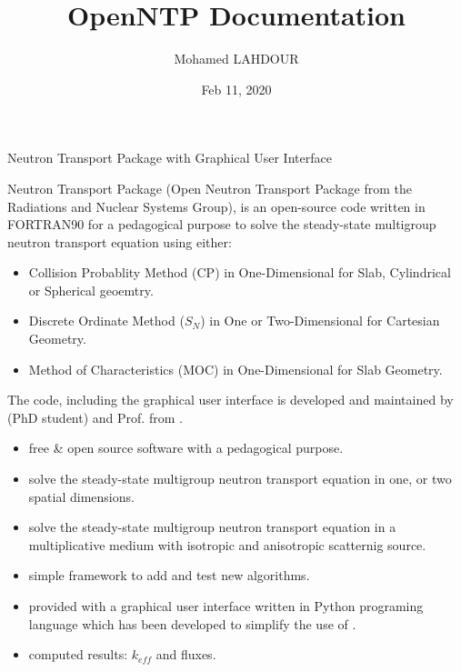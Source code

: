 \documentclass[letterpaper,10pt,english]{sphinxmanual}
\title{OpenNTP Documentation}
\date{Feb 11, 2020}
\author{Mohamed LAHDOUR}
\begin{document}
\pagestyle{empty}
\sphinxmaketitle
\pagestyle{plain}
\sphinxtableofcontents
\pagestyle{normal}
\label{\detokenize{index::doc}}


Neutron Transport Package with Graphical User Interface

Neutron Transport Package  (Open Neutron Transport Package from the Radiations and Nuclear Systems Group), is an open-source code written in FORTRAN90 for a pedagogical purpose to solve the steady-state multigroup neutron transport equation using either:
\begin{itemize}
\item {} 
Collision Probablity Method (CP) in One-Dimensional for Slab, Cylindrical or Spherical geoemtry.

\item {} 
Discrete Ordinate Method (\(S_{N}\)) in One or Two-Dimensional for Cartesian Geometry.

\item {} 
Method of Characteristics (MOC) in One-Dimensional for Slab Geometry.

\end{itemize}

The code, including the graphical user interface is developed and maintained by  (PhD student) and Prof.  from  .

\begin{itemize}
\item {} 
free \& open source software with a pedagogical purpose.

\item {} 
solve the steady-state multigroup neutron transport equation in one, or two spatial dimensions.

\item {} 
solve the steady-state multigroup neutron transport equation  in a multiplicative medium with isotropic and anisotropic scatternig source.

\item {} 
simple framework to add and test new algorithms.

\item {} 
provided with a graphical user interface written in Python programing language which has been developed to simplify the use of .

\item {} 
computed results: \(k_{eff}\) and fluxes.

\end{itemize}
\end{document}
